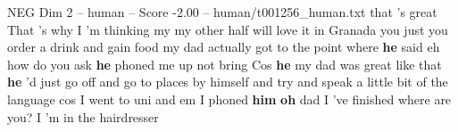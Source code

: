 \begin{textsample}{NEG Dim 2 – human – Score -2.00 – human/t001256\_human.txt}  \label{ex:f2_neg_018}
that 's great That 's why I 'm thinking my my other half will love it in Granada you just you order a drink and gain food my dad actually got to the point where \textbf{he} said eh how do you ask \textbf{he} phoned me up not bring Cos \textbf{he} my dad was great like that \textbf{he} 'd just go off and go to places by himself and try and speak a little bit of the language cos I went to uni and em I phoned \textbf{him} \textbf{oh} dad I 've finished where are you?
I 'm in the hairdresser

\end{textsample}
